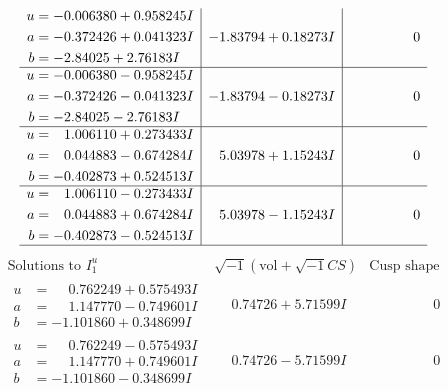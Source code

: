 \documentclass[1p]{elsarticle_modified}
\theoremstyle{definition}
\newcommand{\I}{\sqrt{-1}}
\begin{document}
$$\begin{array}{c|c|c}
\begin{aligned}
u &= -0.006380 + 0.958245 I \\
a &= -0.372426 + 0.041323 I \\
b &= -2.84025 + 2.76183 I\end{aligned}
 & -1.83794 + 0.18273 I & \phantom{-0.000000 } 0 \\ \hline\begin{aligned}
u &= -0.006380 - 0.958245 I \\
a &= -0.372426 - 0.041323 I \\
b &= -2.84025 - 2.76183 I\end{aligned}
 & -1.83794 - 0.18273 I & \phantom{-0.000000 } 0 \\ \hline\begin{aligned}
u &= \phantom{-}1.006110 + 0.273433 I \\
a &= \phantom{-}0.044883 - 0.674284 I \\
b &= -0.402873 + 0.524513 I\end{aligned}
 & \phantom{-}5.03978 + 1.15243 I & \phantom{-0.000000 } 0 \\ \hline\begin{aligned}
u &= \phantom{-}1.006110 - 0.273433 I \\
a &= \phantom{-}0.044883 + 0.674284 I \\
b &= -0.402873 - 0.524513 I\end{aligned}
 & \phantom{-}5.03978 - 1.15243 I & \phantom{-0.000000 } 0\\
 \hline 
 \end{array}$$\newpage$$\begin{array}{c|c|c}  
\text{Solutions to }I^u_{1}& \I (\text{vol} + \sqrt{-1}CS) & \text{Cusp shape}\\
 \hline 
\begin{aligned}
u &= \phantom{-}0.762249 + 0.575493 I \\
a &= \phantom{-}1.147770 - 0.749601 I \\
b &= -1.101860 + 0.348699 I\end{aligned}
 & \phantom{-}0.74726 + 5.71599 I & \phantom{-0.000000 } 0 \\ \hline\begin{aligned}
u &= \phantom{-}0.762249 - 0.575493 I \\
a &= \phantom{-}1.147770 + 0.749601 I \\
b &= -1.101860 - 0.348699 I\end{aligned}
 & \phantom{-}0.74726 - 5.71599 I & \phantom{-0.000000 } 0 \\ \hline\begin{aligned}

\end{aligned}
\end{array}$$
\end{document}
